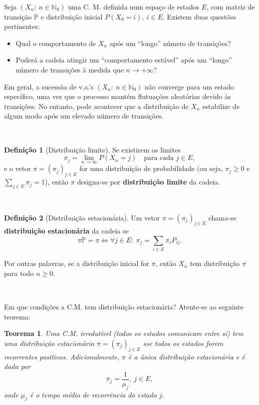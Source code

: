 \documentclass[
  11pt,
  a4paper,
]{book}
\newtheorem{theorem}{Teorema}[chapter]
\theoremstyle{definition}
\newtheorem{definition}{Definição}[chapter]
\theoremstyle{definition}
\theoremstyle{definition}
\theoremstyle{definition}
\theoremstyle{remark}
\begin{document}
Seja \((X_n: ~n \in \mathbb{N}_0)\) uma C. M. definida num espaço de estados \(E\), com matriz de transição \(\mathbb{P}\) e distribuição inicial \(P(X_0=i), ~i \in E\). Existem duas questões pertinentes:

\begin{itemize}
\item
  Qual o comportamento de \(X_n\) após um ``longo'' número de transições?
\item
  Poderá a cadeia atingir um ``comportamento estável'' após um ``longo'' número de transições à medida que \(n \to + \infty\)?
\end{itemize}

Em geral, a sucessão de v.a.'s \((X_n: ~n \in \mathbb{N}_0)\) não converge para um estado específico, uma vez que o processo mantém flutuações aleatórias devido às transições. No entanto, pode acontecer que a distribuição de \(X_n\) estabilize de algum modo após um elevado número de transições.

\(\,\)

\begin{definition}[Distribuição limite]
Se existirem os limites
\[
\pi_j = \lim_{n \to \infty} P(X_n = j)\quad\text{para cada } j\in E,
\]
e o vetor \(\pi=(\pi_j)_{j\in E}\) for uma distribuição de probabilidade (ou seja, \(\pi_j\ge 0\) e \(\sum_{j\in E}\pi_j=1\)), então \(\pi\) designa-se por \textbf{distribuição limite} da cadeia.
\end{definition}

\(\,\)

\begin{definition}[Distribuição estacionária]
Um vetor \(\pi=(\pi_j)_{j\in E}\) chama-se \textbf{distribuição estacionária} da cadeia se
\[
\pi \mathbb{P}=\pi \iff \forall j \in E: ~ \pi_j = \sum_{i \in E} \pi_i P_{ij}.
\]

Por outras palavras, se a distribuição inicial for \(\pi\), então \(X_n\) tem distribuição \(\pi\) para todo \(n\ge 0\).
\end{definition}

\(\,\)

Em que condições a C.M. tem distribuição estacionária? Atente-se ao seguinte teorema:

\begin{theorem}
Uma C.M. irredutível (todos os estados comunicam entre si) tem uma distribuição estacionária \(\pi=(\pi_j)_{j\in E}\)
sse todos os estados forem recorrentes positivos. Adicionalmente, \({\pi}\) é a única distribuição estacionária e é dada por
\[\pi_j=\dfrac{1}{\mu_j}, ~j \in E,\]
onde \(\mu_j\) é o tempo médio de recorrência do estado \(j\).
\end{theorem}
\end{document}
